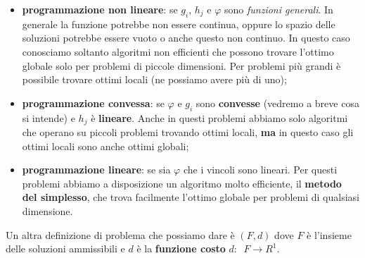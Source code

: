 \documentclass[11pt]{book}
\begin{document}
\begin{itemize}
  
\item {\bf programmazione non lineare}: se $g_i$, $h_j$ e $\varphi$
  sono {\em funzioni generali}. In generale la funzione potrebbe non
  essere continua, oppure lo spazio delle soluzioni potrebbe essere
  vuoto o anche questo non continuo. In questo caso conosciamo
  soltanto algoritmi non efficienti che possono trovare l'ottimo
  globale solo per problemi di piccole dimensioni. Per problemi pi\`u
  grandi \`e possibile trovare ottimi locali (ne possiamo avere pi\`u
  di uno);

\item {\bf programmazione convessa}: se $\varphi$ e $g_i$ sono {\bf
  convesse} (vedremo a breve cosa si intende) e $h_j$ \`e {\bf
  lineare}. Anche in questi problemi abbiamo solo algoritmi che
  operano su piccoli problemi trovando ottimi locali, {\bf ma} in
  questo caso gli ottimi locali sono anche ottimi globali;

\item {\bf programmazione lineare}: se sia $\varphi$ che i vincoli
  sono lineari. Per questi problemi abbiamo a disposizione un
  algoritmo molto efficiente, il {\bf metodo del simplesso}, che trova
  facilmente l'ottimo globale per problemi di qualsiasi dimensione.

\end{itemize}

Un altra definizione di problema che possiamo dare \`e $(F, d)$ dove
$F$ \`e l'insieme delle soluzioni ammissibili e $d$ \`e la {\bf
  funzione costo} $d:\phantom{a}F\rightarrow R^1$.


\end{document}
